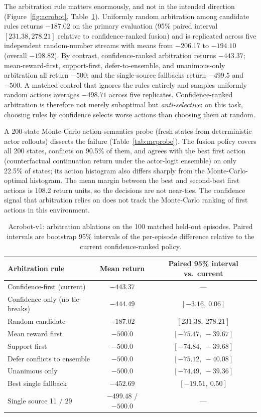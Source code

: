 \documentclass[11pt]{article}
\begin{document}
The arbitration rule matters enormously, and not in the intended direction
(Figure~\ref{fig:acrobot}, Table~\ref{tab:ablations}). Uniformly random arbitration among candidate
rules returns $-187.02$ on the primary evaluation (95\% paired interval $[231.38,278.21]$ relative
to confidence-ranked fusion) and is replicated across five independent random-number streams with
means from $-206.17$ to $-194.10$ (overall $-198.82$). By contrast, confidence-ranked arbitration
returns $-443.37$; mean-reward-first, support-first, defer-to-ensemble, and unanimous-only
arbitration all return $-500$; and the single-source fallbacks return $-499.5$ and $-500$. A matched
control that ignores the rules entirely and samples uniformly random actions averages $-498.71$
across five replicates. Confidence-ranked arbitration is therefore not merely suboptimal but
\emph{anti-selective}: on this task, choosing rules by confidence selects worse actions than
choosing them at random.

A 200-state Monte-Carlo action-semantics probe (fresh states from deterministic actor rollouts)
dissects the failure (Table~\ref{tab:mcprobe}). The fusion policy covers all 200 states, conflicts
on 90.5\% of them, and agrees with the best first action (counterfactual continuation return under
the actor-logit ensemble) on only 22.5\% of states; its action histogram also differs sharply from
the Monte-Carlo-optimal histogram. The mean margin between the best and second-best first actions is
108.2 return units, so the decisions are not near-ties. The confidence signal that arbitration
relies on does not track the Monte-Carlo ranking of first actions in this environment.

\begin{table}[t]
\centering
\caption{Acrobot-v1: arbitration ablations on the 100 matched held-out episodes. Paired intervals
are bootstrap 95\% intervals of the per-episode difference relative to the current
confidence-ranked policy.}
\label{tab:ablations}
\begin{tabular}{lcc}
\toprule
Arbitration rule & Mean return & Paired 95\% interval vs.\ current \\
\midrule
Confidence-first (current) & $-443.37$ & --- \\
Confidence only (no tie-breaks) & $-444.49$ & $[-3.16,\ 0.06]$ \\
Random candidate & $-187.02$ & $[231.38,\ 278.21]$ \\
Mean reward first & $-500.0$ & $[-75.47,\ -39.67]$ \\
Support first & $-500.0$ & $[-74.84,\ -39.68]$ \\
Defer conflicts to ensemble & $-500.0$ & $[-75.12,\ -40.08]$ \\
Unanimous only & $-500.0$ & $[-74.49,\ -39.36]$ \\
Best single fallback & $-452.69$ & $[-19.51,\ 0.50]$ \\
Single source 11 / 29 & $-499.48$ / $-500.0$ & --- \\
\bottomrule
\end{tabular}
\end{table}
\end{document}
